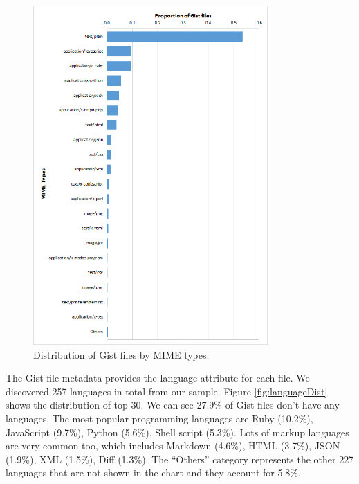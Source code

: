 \begin{figure}[!htbp]
	\centering
	\includegraphics[width=0.8\textwidth]{figures/typeDistribution.png}
	\caption{Distribution of Gist files by MIME types.}
	\label{fig:typeDist}
\end{figure}

The Gist file metadata provides the language attribute for each file. We discovered 257 languages in total from our sample. Figure \ref{fig:languageDist} shows the distribution of top 30. We can see 27.9\% of Gist files don't have any languages. The most popular programming languages are Ruby (10.2\%), JavaScript (9.7\%), Python (5.6\%), Shell script (5.3\%). Lots of markup languages are very common too, which includes Markdown (4.6\%), HTML (3.7\%), JSON (1.9\%), XML (1.5\%), Diff (1.3\%). The ``Others'' category represents the other 227 languages that are not shown in the chart and they account for 5.8\%. 

